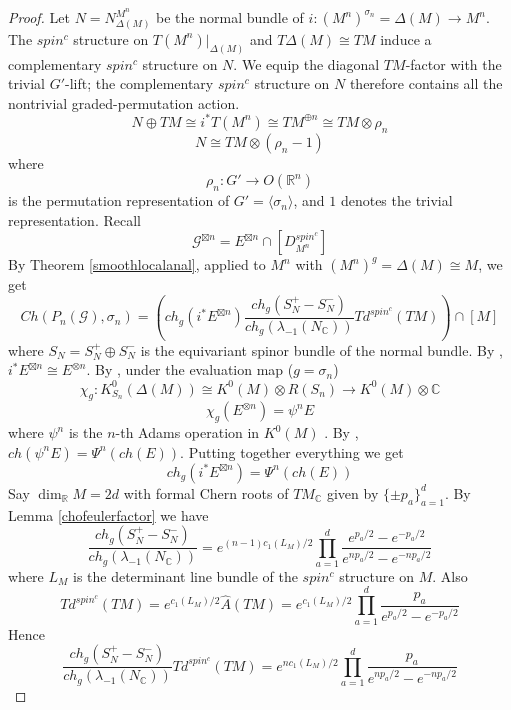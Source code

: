 \documentclass[11pt,leqno,twoside]{amsart}
\theoremstyle{plainsl}
\theoremstyle{definition}
\begin{document}
\begin{proof}
Let $N=N^{M^n}_{\Delta(M)}$ be the normal bundle of $i:(M^n)^{\sigma_n}=\Delta(M)\rightarrow M^n$. The
$spin^c$ structure on $T(M^n)|_{\Delta(M)}$ and $T\Delta(M)\cong TM$ induce a
complementary $spin^c$ structure on $N$.  We equip the diagonal $TM$-factor with the trivial $G'$-lift; the complementary
$spin^c$ structure on $N$ therefore contains all the nontrivial
graded-permutation action. 
\begin{equation}\label{copatibliltynormalproduct}
N\oplus TM
\cong
i^*T(M^n)
\cong
TM^{\oplus n}
\cong
TM\otimes\rho_n
\end{equation}
\begin{equation}\label{N_of_symmetric}
N\cong TM\otimes(\rho_n-1)
\end{equation}
where
\[
\rho_n:G'\longrightarrow O(\mathbb{R}^n)
\]
is the permutation representation of
$G'=\langle\sigma_n\rangle$, and $1$ denotes the trivial
representation.  Recall
\[\mathcal{G}^{\boxtimes n}=E^{\boxtimes n}\cap[D_{M^n}^{spin^c}]\]
By Theorem
\ref{smoothlocalanal}, applied to $M^n$ with
$(M^n)^g=\Delta(M)\cong M$, we get
\[
Ch(P_n(\mathcal{G}),\sigma_n)
=
\left(
ch_g(i^*E^{\boxtimes n})
\frac{ch_g(S_N^+-S_N^-)}
{ch_g(\lambda_{-1}(N_{\mathbb{C}}))}
Td^{spin^c}(TM)
\right)\cap[M]
\]
where
$
S_N=S_N^+\oplus S_N^-
$
is the equivariant spinor bundle of the normal bundle. By \cite[Eq.~(3.1)]{At}, $i^*E^{\boxtimes n} \cong E^{\otimes n}$. By  \cite[p.~179]{At}, under the evaluation map ($g=\sigma_n$)
\[\chi_g:K_{S_n}^0(\Delta(M))\cong K^0(M)\otimes R(S_n)\rightarrow K^0(M)\otimes \mathbb{C} \]
\[\chi_g(E^{\otimes n})= \psi^n E\]
where $\psi^n$ is the $n$-th Adams operation in $K^0(M)$ \cite[Prop.~3.2]{At}. By \cite[\S~7]{At}, $ch(\psi^n E)
=
\Psi^n(ch(E))$. Putting together everything we get 
\[ch_g(i^*E^{\boxtimes n})=\Psi^n(ch(E))\]
Say
$
\dim_{\mathbb{R}}M=2d
$
with formal Chern roots of $TM_{\mathbb{C}}$ given by
$\{\pm p_a\}_{a=1}^d$. By Lemma \ref{chofeulerfactor} we have
\begin{equation}
\frac{ch_g(S_N^+-S_N^-)}
{ch_g(\lambda_{-1}(N_{\mathbb{C}}))}
=
e^{(n-1)c_1(L_M)/2}
\prod_{a=1}^d
\frac{e^{p_a/2}-e^{-p_a/2}}
{e^{np_a/2}-e^{-np_a/2}}
\end{equation}
where $L_M$ is the determinant line bundle of the $spin^c$ structure
on $M$. Also
\[
Td^{spin^c}(TM)
=
e^{c_1(L_M)/2}\hat{A}(TM)
=
e^{c_1(L_M)/2}
\prod_{a=1}^d
\frac{p_a}{e^{p_a/2}-e^{-p_a/2}}
\]
Hence
\[
\frac{ch_g(S_N^+-S_N^-)}
{ch_g(\lambda_{-1}(N_{\mathbb{C}}))}
Td^{spin^c}(TM)
=
e^{nc_1(L_M)/2}
\prod_{a=1}^d
\frac{p_a}{e^{np_a/2}-e^{-np_a/2}}
\]
\end{proof}
\end{document}
